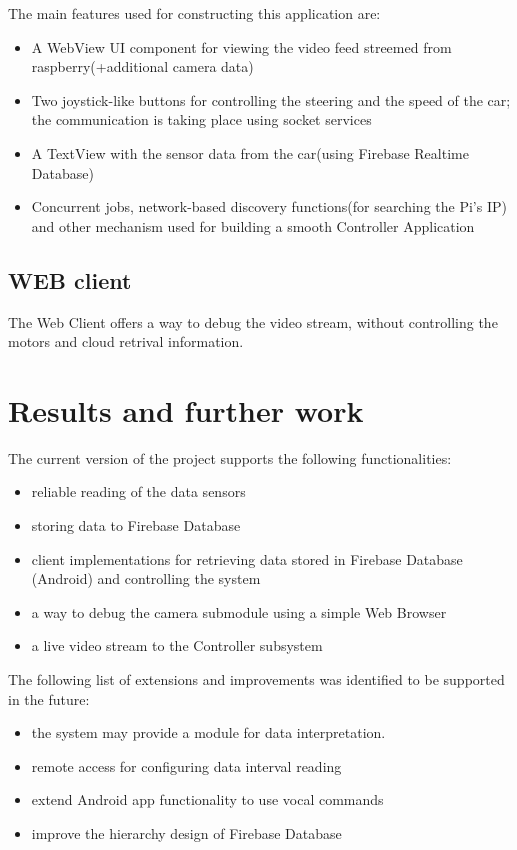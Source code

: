 \documentclass[a4paper,11pt]{article}
\begin{document}
The main features used for constructing this application are:
\begin{itemize} 
\item A WebView UI component for viewing the video feed streemed from raspberry(+additional camera data)
\item Two joystick-like buttons for controlling the steering and the speed of the car; the communication is taking place using socket services
\item A TextView with the sensor data from the car(using Firebase Realtime Database)
\item Concurrent jobs, network-based discovery functions(for searching the Pi's IP) and other mechanism used for building a smooth Controller Application
\end{itemize}

\subsection{WEB client}

The Web Client offers a way to debug the video stream, without controlling the motors and cloud retrival information.\\

\section{Results and further work}

The current version of the project supports the following functionalities:
\begin{itemize}  
\item reliable reading of the data sensors
\item storing data to Firebase Database
\item client implementations for retrieving data stored in Firebase Database (Android) and controlling the system
\item a way to debug the camera submodule using a simple Web Browser
\item a live video stream to the Controller subsystem
\end{itemize}

The following list of extensions and improvements was identified to be supported in the future:
\begin{itemize}  
\item the system may provide a module for data interpretation.
\item remote access for configuring data interval reading
\item extend Android app functionality to use vocal commands
\item improve the hierarchy design of Firebase Database
\end{itemize}
\end{document}
